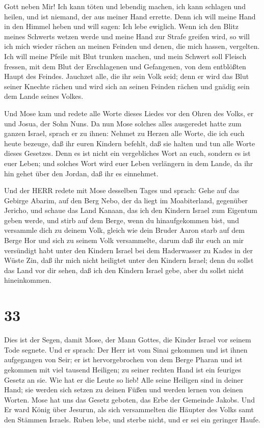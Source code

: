 Gott neben Mir! Ich kann töten und lebendig machen, ich kann schlagen
und heilen, und ist niemand, der aus meiner Hand errette. 
Denn ich will meine Hand in den Himmel heben und will sagen: Ich lebe
ewiglich.  Wenn ich den Blitz meines Schwerts wetzen werde
und meine Hand zur Strafe greifen wird, so will ich mich wieder rächen
an meinen Feinden und denen, die mich hassen, vergelten. 
Ich will meine Pfeile mit Blut trunken machen, und mein Schwert soll
Fleisch fressen, mit dem Blut der Erschlagenen und Gefangenen, von dem
entblößten Haupt des Feindes.  Jauchzet alle, die ihr sein
Volk seid; denn er wird das Blut seiner Knechte rächen und wird sich an
seinen Feinden rächen und gnädig sein dem Lande seines Volkes.

 Und Mose kam und redete alle Worte dieses Liedes vor den
Ohren des Volks, er und Josua, der Sohn Nuns.  Da nun Mose
solches alles ausgeredet hatte zum ganzen Israel,  sprach
er zu ihnen: Nehmet zu Herzen alle Worte, die ich euch heute bezeuge,
daß ihr euren Kindern befehlt, daß sie halten und tun alle Worte dieses
Gesetzes.  Denn es ist nicht ein vergebliches Wort an euch,
sondern es ist euer Leben; und solches Wort wird euer Leben verlängern
in dem Lande, da ihr hin gehet über den Jordan, daß ihr es einnehmet.

 Und der HERR redete mit Mose desselben Tages und sprach:
 Gehe auf das Gebirge Abarim, auf den Berg Nebo, der da
liegt im Moabiterland, gegenüber Jericho, und schaue das Land Kanaan,
das ich den Kindern Israel zum Eigentum geben werde,  und
stirb auf dem Berge, wenn du hinaufgekommen bist, und versammle dich zu
deinem Volk, gleich wie dein Bruder Aaron starb auf dem Berge Hor und
sich zu seinem Volk versammelte,  darum daß ihr euch an mir
versündigt habt unter den Kindern Israel bei dem Haderwasser zu Kades in
der Wüste Zin, daß ihr mich nicht heiligtet unter den Kindern Israel;
 denn du sollst das Land vor dir sehen, daß ich den Kindern
Israel gebe, aber du sollst nicht hineinkommen.

\hypertarget{section-32}{%
\section{33}\label{section-32}}

 Dies ist der Segen, damit Mose, der Mann Gottes, die Kinder
Israel vor seinem Tode segnete.  Und er sprach: Der Herr ist
vom Sinai gekommen und ist ihnen aufgegangen von Seir; er ist
hervorgebrochen von dem Berge Pharan und ist gekommen mit viel tausend
Heiligen; zu seiner rechten Hand ist ein feuriges Gesetz an sie.
 Wie hat er die Leute so lieb! Alle seine Heiligen sind in
deiner Hand; sie werden sich setzen zu deinen Füßen und werden lernen
von deinen Worten.  Mose hat uns das Gesetz geboten, das
Erbe der Gemeinde Jakobs.  Und Er ward König über Jesurun,
als sich versammelten die Häupter des Volks samt den Stämmen Israels.
 Ruben lebe, und sterbe nicht, und er sei ein geringer
Haufe.

